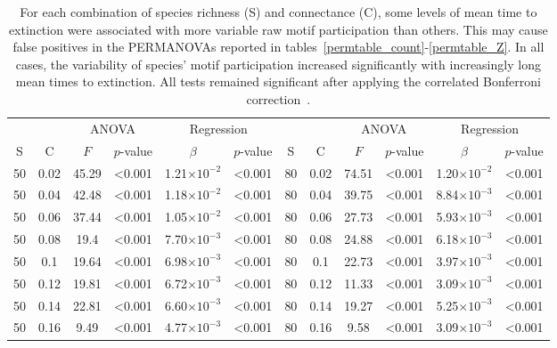 \documentclass[12pt]{article}
\begin{document}
\begin{spacing}{2.0}
		\begin{table}[hb!]
			\caption{For each combination of species richness (S) and connectance (C), some levels of mean time to extinction were associated with more variable raw motif participation than others. This may cause false positives in the PERMANOVAs reported in tables~\ref{permtable_count}-\ref{permtable_Z}. In all cases, the variability of species' motif participation increased significantly with increasingly long mean times to extinction. All tests remained significant after applying the correlated Bonferroni correction~\citep{Drezner2016}.}
			\label{betadisp_count}
			\footnotesize
			\begin{tabular}{c c | c c| c c ||c c | c c | c c |}
				&		&	\multicolumn{2}{c|}{ANOVA}	&\multicolumn{2}{c||}{Regression} 			& & & 	\multicolumn{2}{c|}{ANOVA}		 	&	 \multicolumn{2}{c|}{Regression} 			\\
	            S	&	C	&	$F$	&	$p$-value	&	$\beta$	&	$p$-value	&	S	&	C	&	$F$	&	$p$-value	&	$\beta$	&	$p$-value	\\
				\hline
                50  & 0.02  & 45.29 & \textless0.001 & 1.21$\times10^{-2}$ & \textless0.001 & 80  & 0.02  & 74.51 & \textless0.001 & 1.20$\times10^{-2}$ & \textless0.001 \\
                50  & 0.04  & 42.48 & \textless0.001 & 1.18$\times10^{-2}$ & \textless0.001 & 80  & 0.04  & 39.75 & \textless0.001 & 8.84$\times10^{-3}$ & \textless0.001 \\
                50  & 0.06  & 37.44 & \textless0.001 & 1.05$\times10^{-2}$ & \textless0.001 & 80  & 0.06  & 27.73 & \textless0.001 & 5.93$\times10^{-3}$ & \textless0.001 \\
                50  & 0.08  & 19.4  & \textless0.001 & 7.70$\times10^{-3}$ & \textless0.001 & 80  & 0.08  & 24.88 & \textless0.001 & 6.18$\times10^{-3}$ & \textless0.001 \\
                50  & 0.1 & 19.64 & \textless0.001 & 6.98$\times10^{-3}$ & \textless0.001 & 80  & 0.1 & 22.73 & \textless0.001 & 3.97$\times10^{-3}$ & \textless0.001 \\
                50  & 0.12  & 19.81 & \textless0.001 & 6.72$\times10^{-3}$ & \textless0.001 & 80  & 0.12  & 11.33 & \textless0.001 & 3.09$\times10^{-3}$ & \textless0.001 \\
                50  & 0.14  & 22.81 & \textless0.001 & 6.60$\times10^{-3}$ & \textless0.001 & 80  & 0.14  & 19.27 & \textless0.001 & 5.25$\times10^{-3}$ & \textless0.001 \\
                50  & 0.16  & 9.49  & \textless0.001 & 4.77$\times10^{-3}$ & \textless0.001 & 80  & 0.16  & 9.58  & \textless0.001 & 3.09$\times10^{-3}$ & \textless0.001 \\

\end{tabular}
\end{table}
\end{spacing}
\end{document}
